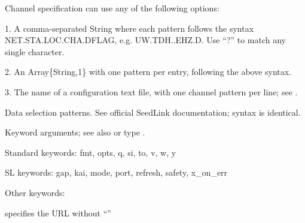 \documentclass[letterpaper,11pt,english]{sphinxmanual}
\begin{document}
\begin{fulllineitems}
\end{fulllineitems}



\begin{fulllineitems}
\end{fulllineitems}



\begin{fulllineitems}
\end{fulllineitems}


\begin{DUlineblock}{0em}
\item[] 
\item[] Channel specification can use any of the following options:
\item[] 
\item[] 1. A comma-separated String where each pattern follows the syntax NET.STA.LOC.CHA.DFLAG, e.g. UW.TDH..EHZ.D. Use “?” to match any single character.
\item[] 2. An Array\{String,1\} with one pattern per entry, following the above syntax.
\item[] 3. The name of a configuration text file, with one channel pattern per line; see {\hyperref[\detokenize{src/Appendices/web_syntax:ccfg}]{}}.
\item[] 
\item[] 
\item[] Data selection patterns. See official SeedLink documentation; syntax is identical.
\item[] 
\item[] 
\item[] Keyword arguments; see also {\hyperref[\detokenize{src/Appendices/keywords:dkw}]{}} or type .
\item[] Standard keywords: fmt, opts, q, si, to, v, w, y
\item[] SL keywords: gap, kai, mode, port, refresh, safety, x\_on\_err
\item[] Other keywords:
\item[]  specifies the URL without “”
\end{DUlineblock}
\end{document}
